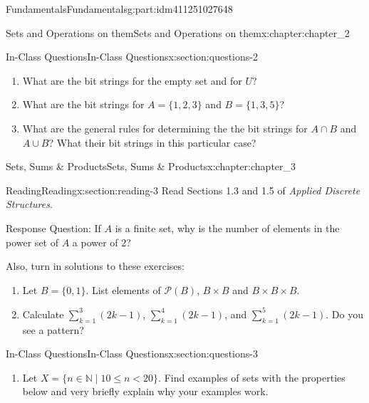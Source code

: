 \documentclass[oneside,10pt,]{book}
\numberwithin{equation}{section}
\newcommand{\lt}{<}
\begin{document}
\begin{partptx}{Fundamentals}{}{Fundamentals}{}{}{g:part:idm411251027648}
\begin{chapterptx}{Sets and Operations on them}{}{Sets and Operations on them}{}{}{x:chapter:chapter_2}
\begin{sectionptx}{In-Class Questions}{}{In-Class Questions}{}{}{x:section:questions-2}
\begin{enumerate}[label=\arabic*.]
\begin{enumerate}[label=(\alph*)]
\item{}What are the bit strings for the empty set and for \(U\)?%
\item{}What are the bit strings for \(A=\{1,2,3\}\) and \(B=\{1,3,5\}\)?%
\item{}What are the general rules for determining the the bit strings for \(A\cap B\) and \(A \cup B\)?  What their bit strings in this particular case?%
\end{enumerate}
%
\end{enumerate}
%
\end{sectionptx}
\end{chapterptx}
%
\typeout{************************************************}
\typeout{************************************************}
%
\begin{chapterptx}{Sets, Sums \& Products}{}{Sets, Sums \& Products}{}{}{x:chapter:chapter_3}
%
%
%
%
%
\typeout{************************************************}
\typeout{************************************************}
%
\begin{sectionptx}{Reading}{}{Reading}{}{}{x:section:reading-3}
Read Sections 1.3 and 1.5 of \emph{Applied Discrete Structures}.%
\par
Response Question:  If \(A\) is a finite set, why is the number of elements in the power set of \(A\) a power of 2?%
\par
Also, turn in solutions to these exercises:%
\begin{enumerate}[label=\arabic*.]
\item{}Let \(B=\{0,1\}\).  List elements of  \(\mathcal{P}(B)\),  \(B\times B\) and \(B\times B\times B\).%
\item{}Calculate \(\sum_{k=1}^3 (2k-1)\), \(\sum_{k=1}^4 (2k-1)\), and \(\sum_{k=1}^5 (2k-1)\). Do you see a pattern?%
\end{enumerate}
%
\end{sectionptx}
%
%
\typeout{************************************************}
\typeout{************************************************}
%
\begin{sectionptx}{In-Class Questions}{}{In-Class Questions}{}{}{x:section:questions-3}
%
\begin{enumerate}[label=\arabic*.]
\item{}Let \(X = \{n \in \mathbb{N} \mid 10 \leq n \lt 20\}\).  Find examples of sets with the properties below and very briefly explain why your examples work.%

\end{enumerate}
\end{sectionptx}
\end{chapterptx}
\end{partptx}
\end{document}
